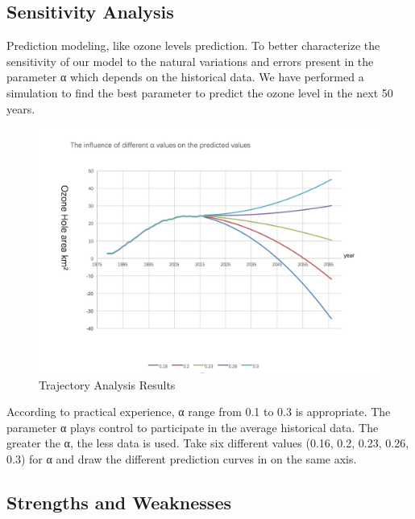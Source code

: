 \documentclass[12pt]{article}
\begin{document}
\subsection{Sensitivity Analysis}
Prediction modeling, like ozone levels prediction. To better characterize the sensitivity of our model to the natural variations and errors present in the parameter α which depends on the historical data. We have performed a simulation to find the best parameter to predict the ozone level in the next 50 years.
\begin{center}
\begin{figure}[htpb]
\centering
\includegraphics[scale=0.6]{ts}
\caption{Trajectory Analysis Results}\label{fig:xgxfx}
\end{figure}
\end{center}
According to practical experience, α range from 0.1 to 0.3 is appropriate. The parameter α plays control to participate in the average historical data. The greater the α, the less data is used. Take six different values (0.16, 0.2, 0.23, 0.26, 0.3) for α and draw the different prediction curves in on the same axis.
\subsection{Strengths and Weaknesses}
\end{document}
